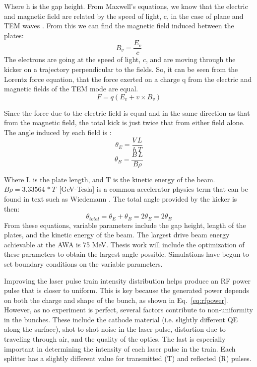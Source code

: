 \documentclass{iitthesis}
\begin{document}
Where h is the gap height. From Maxwell's equations, we know that the electric and magnetic 
field are related by the speed of light, c, in the case of plane and TEM waves \cite{pozar}. 
From this we can find the magnetic field induced between the plates: 
\begin{equation}
B_v=\frac{E_v}{c}
\end{equation}
The electrons are going at the speed of light, $c$, and are moving through the kicker on a 
trajectory perpendicular to the fields.  So, it can be seen from the Lorentz force equation, that the force 
exerted on a charge q from the electric and magnetic fields of the TEM mode are equal. 
\begin{equation}
F=q(E_v+v\times B_v)
\end{equation}

Since the force due to the electric field is equal and in the same direction as that from the magnetic field, 
the total kick is just twice that from either field alone.  The angle induced by each field is \cite{iukicker, Wiedemann}:  
\begin{equation}
\theta_E= \frac{V\,L}{h\,T}
\end{equation}
\begin{equation}
\theta_B= \frac{B\,L}{B\rho}
\end{equation}

Where L is the plate length, and T is the kinetic energy of the beam. $B\rho=3.33564\,*T\,$ [GeV-Tesla] is a 
common accelerator physics term that can be found in text such as Wiedemann \cite{Wiedemann}. 
The total angle provided by the kicker is then: 
\begin{equation}
\theta_{total}= \theta_E+\theta_B=2\theta_E=2\theta_B
\end{equation}
From these equations, variable parameters include the gap height, length of the plates, and 
the kinetic energy of the beam. The largest drive beam energy achievable at the AWA is 75 MeV. 
Thesis work will include the optimization of these parameters to obtain the largest angle possible.
Simulations have begun to set boundary conditions on the variable parameters. 




 \label{sec:uvoptics}

Improving the laser pulse train intensity distribution helps
produce an RF power pulse that is closer to uniform. This is key because the generated power depends on both the 
charge and shape of the bunch, as shown in Eq.~\ref{eq:rfpower}. However, as no experiment is perfect, 
several factors contribute to non-uniformity in the bunches. These include the cathode material
(i.e. slightly different QE along the surface), shot to shot noise in the laser pulse, 
distortion due to traveling through air, and the quality of the optics. The last is especially important 
in determining the intensity of each laser pulse in the train.  
Each splitter has a slightly different value for transmitted (T) and reflected (R) pulses. 
\end{document}
